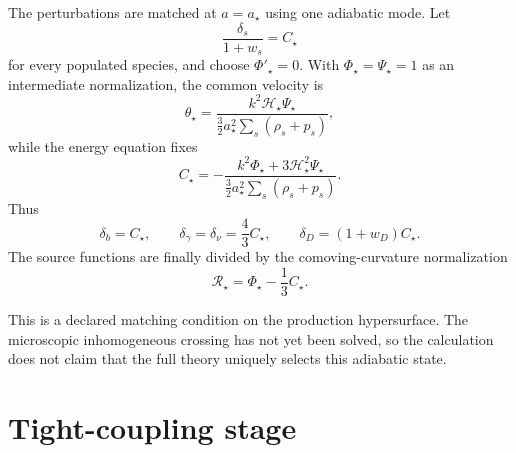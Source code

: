 The perturbations are matched at $a=a_\star$ using one adiabatic mode.  Let
\begin{equation}
 \frac{\delta_s}{1+w_s}=C_\star
 \label{eq:pcmb-adiabatic-condition}
\end{equation}
for every populated species, and choose $\Phi'_\star=0$.  With $\Phi_\star=\Psi_\star=1$ as an intermediate normalization, the common velocity is
\begin{equation}
 \theta_\star
 =\frac{k^2\mathcal H_\star\Psi_\star}
 {\frac32a_\star^2\sum_s(\rho_s+p_s)},
 \label{eq:pcmb-initial-velocity}
\end{equation}
while the energy equation fixes
\begin{equation}
 C_\star
 =-
 \frac{k^2\Phi_\star+3\mathcal H_\star^2\Psi_\star}
 {\frac32a_\star^2\sum_s(\rho_s+p_s)}.
 \label{eq:pcmb-initial-density}
\end{equation}
Thus
\begin{equation}
 \delta_b=C_\star,
 \qquad
 \delta_\gamma=\delta_\nu=\frac43C_\star,
 \qquad
 \delta_D=(1+w_D)C_\star.
 \label{eq:pcmb-species-initial-density}
\end{equation}
The source functions are finally divided by the comoving-curvature normalization
\begin{equation}
 \mathcal R_\star=\Phi_\star-\frac13C_\star.
 \label{eq:pcmb-curvature-normalization}
\end{equation}

This is a declared matching condition on the production hypersurface.  The microscopic inhomogeneous crossing has not yet been solved, so the calculation does not claim that the full theory uniquely selects this adiabatic state.

\section{Tight-coupling stage}

